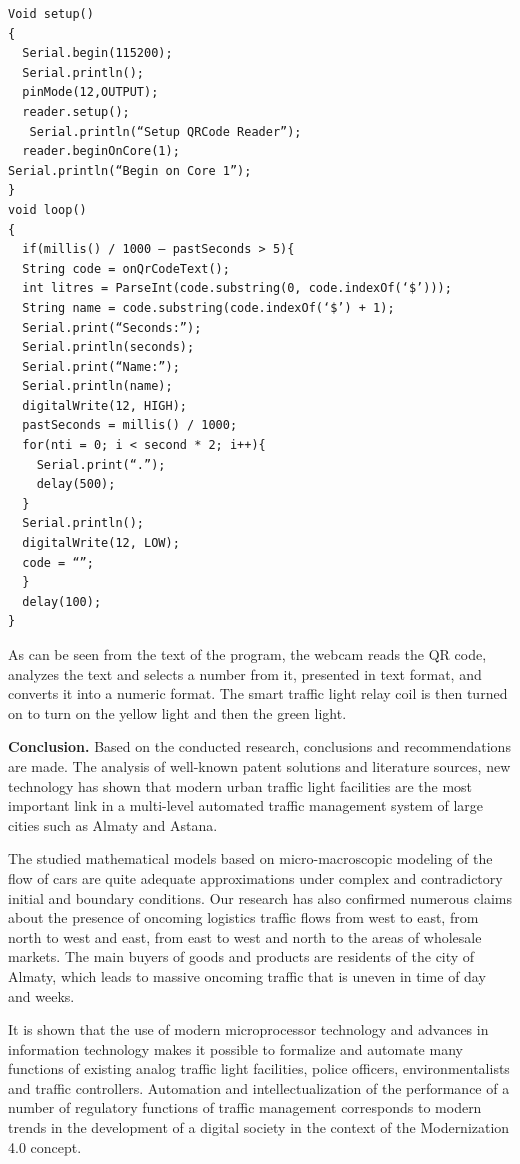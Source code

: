 \begin{verbatim}
Void setup()
{
  Serial.begin(115200);
  Serial.println();
  pinMode(12,OUTPUT);
  reader.setup();
   Serial.println(“Setup QRCode Reader”);
  reader.beginOnCore(1);
Serial.println(“Begin on Core 1”);
}
void loop()
{
  if(millis() / 1000 – pastSeconds > 5){
  String code = onQrCodeText();
  int litres = ParseInt(code.substring(0, code.indexOf(‘$’)));
  String name = code.substring(code.indexOf(‘$’) + 1);
  Serial.print(“Seconds:”);
  Serial.println(seconds);
  Serial.print(“Name:”);
  Serial.println(name);
  digitalWrite(12, HIGH);
  pastSeconds = millis() / 1000;
  for(nti = 0; i < second * 2; i++){
    Serial.print(“.”);
    delay(500);
  }
  Serial.println();
  digitalWrite(12, LOW);
  code = “”;
  }
  delay(100);
}
\end{verbatim}

\begin{multicols}{2}
As can be seen from the text of the program, the webcam reads the QR
code, analyzes the text and selects a number from it, presented in text
format, and converts it into a numeric format. The smart traffic light
relay coil is then turned on to turn on the yellow light and then the
green light.

{\bfseries Conclusion.} Based on the conducted research, conclusions and
recommendations are made. The analysis of well-known patent solutions
and literature sources, new technology has shown that modern urban
traffic light facilities are the most important link in a multi-level
automated traffic management system of large cities such as Almaty and
Astana.

The studied mathematical models based on micro-macroscopic modeling of
the flow of cars are quite adequate approximations under complex and
contradictory initial and boundary conditions. Our research has also
confirmed numerous claims about the presence of oncoming logistics
traffic flows from west to east, from north to west and east, from east
to west and north to the areas of wholesale markets. The main buyers of
goods and products are residents of the city of Almaty, which leads to
massive oncoming traffic that is uneven in time of day and weeks.

It is shown that the use of modern microprocessor technology and
advances in information technology makes it possible to formalize and
automate many functions of existing analog traffic light facilities,
police officers, environmentalists and traffic controllers. Automation
and intellectualization of the performance of a number of regulatory
functions of traffic management corresponds to modern trends in the
development of a digital society in the context of the Modernization 4.0
concept.
\end{multicols}

